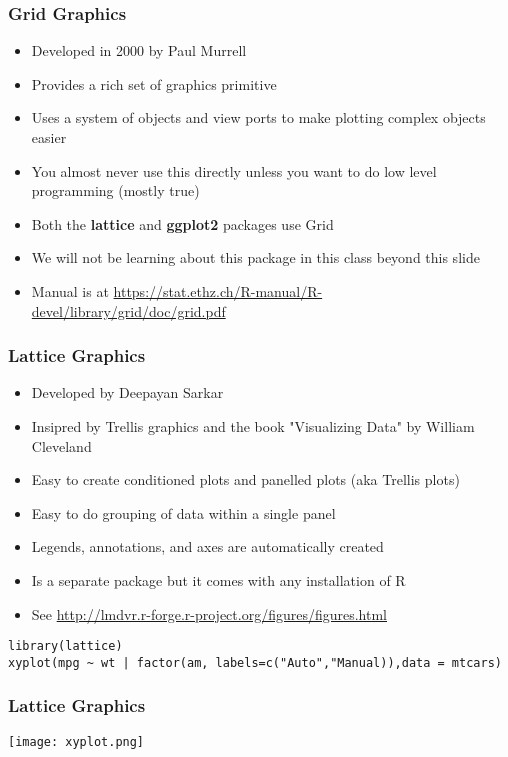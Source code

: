 \documentclass[xcolor=table]{beamer}
\begin{document}
%

\begin{frame}[fragile]
\frametitle{Grid Graphics}
\begin{itemize}
\item Developed in 2000 by Paul Murrell
\item Provides a rich set of graphics primitive
\item Uses a system of objects and view ports to make plotting complex objects easier
\item You almost never use this directly unless you want to do low level programming (mostly true)
\item Both the \textbf{lattice} and \textbf{ggplot2} packages use Grid
\item We will not be learning about this package in this class beyond this slide
\item Manual is at \url{https://stat.ethz.ch/R-manual/R-devel/library/grid/doc/grid.pdf}
\end{itemize}

\end{frame}

%

\begin{frame}[fragile]
\frametitle{Lattice Graphics}
\begin{itemize}
\item Developed by Deepayan Sarkar 
\item Insipred by Trellis graphics and the book "Visualizing Data" by William Cleveland
\item Easy to create conditioned plots and panelled plots (aka Trellis plots)
\item Easy to do grouping of data within a single panel 
\item Legends, annotations, and axes are automatically created
\item Is a separate package but it comes with any installation of R
\item See \url{http://lmdvr.r-forge.r-project.org/figures/figures.html}
\end{itemize}
\footnotesize
\begin{verbatim}
library(lattice)
xyplot(mpg ~ wt | factor(am, labels=c("Auto","Manual)),data = mtcars)
\end{verbatim}

\end{frame}

%

%

\begin{frame}[fragile]
\frametitle{Lattice Graphics}
\begin{center}
\texttt{[image: xyplot.png]}
\end{center}
\end{frame}


\end{document}

